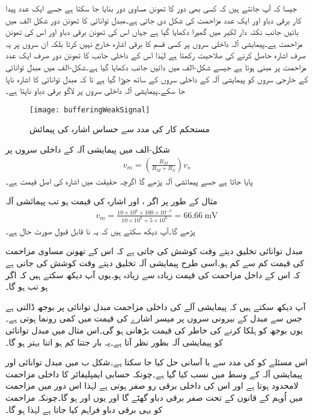 	جیسا کہ آپ جانتے ہیں کہ کسی بھی دور کا تھونن  مساوی دور بنایا جا سکتا ہے جسے ایک عدد پیدا کار برقی دباو اور ایک عدد مزاحمت کی شکل دی جاتی ہے۔مبدل توانائی کا تھونن دور شکل  الف میں بائیں جانب نکتہ دار لکیر میں گھیرا دکھایا گیا ہے جہاں  اس کی تھونن برقی دباو اور   اس کی تھونن مزاحمت ہے۔پیمایشی آلہ داخلی سروں پر کسی قسم کا برقی اشارہ خارج نہیں کرتا بلکہ ان سروں پر یہ صرف اشارہ حاصل کرنے کی صلاحیت رکھتا ہے لہٰذا اس کے داخلی جانب کا تھونن دور صرف ایک عدد مزاحمت   پر مبنی ہوتا ہے جیسے شکل-الف میں دائیں جانب دکھایا گیا ہے۔شکل-الف میں مبدل توانائی کے خارجی سروں کو پیمایشی آلہ کے داخلی سروں کے ساتھ جوڑا گیا ہے تا کہ مبدل توانائی کا اشارہ  ناپا جا سکے۔پیمایشی آلہ داخلی سروں  پر لاگو برقی دباو  ناپتا ہے۔
\begin{figure}
\centering
\texttt{[image: bufferingWeakSignal]}
\caption{مستحکم کار کی مدد سے حساس اشارہ کی  پیمائش}
\label{شکل_وسطی_دور_حساس_اشارہ}
\end{figure}
شکل-الف میں پیمایشی آلہ کے داخلی سروں پر
\begin{align*}
v_m=\left(\frac{R_M }{R_M+R_S} \right) v_s
\end{align*}
پایا جاتا ہے جسے پیمائشی آلہ پڑھے گا  اگرچہ حقیقت میں اشارہ کی اصل قیمت   ہے۔

	مثال کے طور پر اگر ، اور اشارہ کی قیمت ہو تب پیمائشی آلہ
\begin{align*}
v_m = \frac{10 \times 10^{6} \times 100 \times 10^{-3}}{10 \times 10^{6}+5 \times 10^{6}}=\SI{66.66}{\milli \volt}
\end{align*}
پڑھے گا۔آپ دیکھ سکتے ہیں کہ یہ نا قابل قبول صورت حال ہے۔

مبدل توانائی تخلیق دیتے وقت کوشش کی جاتی ہے کہ اس کے تھونن مساوی مزاحمت  کی قیمت کم سے کم ہو۔اسی طرح پیمایشی آلہ تخلیق دیتے وقت کوشش کی جاتی ہے کہ اس کے داخل مزاحمت  کی قیمت زیادہ سے زیادہ ہو۔یوں آپ دیکھ سکتے ہیں کہ اگر  ہو تب  ہو گا۔

آپ دیکھ سکتے ہیں کہ پیمایشی آلے کی داخلی مزاحمت مبدل توانائی پر بوجھ ڈالتی ہے جس سے مبدل کے بیرونی سروں پر میسر اشارے کی قیمت میں کمی رونما ہوتی ہے۔یوں بوجھ کو ہلکا کرنے کی خاطر  کی قیمت بڑھانی ہو گی۔اس مثال میں مبدل توانائی کو پیمایشی آلہ بطور   نظر آتا ہے۔یہ بار جتنا کم ہو اتنا بہتر ہو گا۔

اس مسئلے کو  کی مدد سے با آسانی حل کیا جا سکتا ہے۔شکل  ب میں مبدل توانائی اور پیمایشی آلہ کے وسط میں  نسب کیا گیا ہے۔چونکہ حسابی ایمپلیفائر کا داخلی مزاحمت لامحدود ہوتا ہے اور اس کی داخلی برقی رو صفر ہوتی ہے لہٰذا اس دور میں مزاحمت  میں اُوہم کے قانون کے تحت صفر برقی دباو گھٹے گا اور یوں   اور   ہو گا۔چونکہ مزاحمت  کو یہی برقی دباو فراہم کیا جاتا ہے لہٰذا  ہو گا۔


